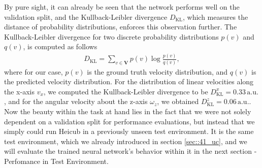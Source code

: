 By pure sight, it can already be seen that the network performs well on the validation split, and the Kullback-Leibler divergence $D_\text{KL}$, which measures the distance of probability distributions, enforces this observation further. The Kullback-Leibler divergence for two discrete probability distributions $p(v)$ and $q(v)$, is computed as follows
\begin{align}
	D_\text{KL} = \sum_{v\in \bm{V}}p(v)\log\frac{p(v)}{q(v)},
\end{align}
where for our case, $p(v)$ is the ground truth velocity distribution, and $q(v)$ is the predicted velocity distribution. For the distribution of linear velocities along the x-axis $v_x$, we computed the Kullback-Leibler divergence to be $D^x_\text{KL}=0.33\,\text{a.u.}$, and for the angular velocity about the z-axis $\omega_z$, we obtained $D^z_\text{KL}=0.06\,\text{a.u.}$. Now the beauty within the task at hand lies in the fact that we were not solely dependent on a validation split for performance evaluations, but instead that we simply could run Heicub in a previously unseen test environment. It is the same test environment, which we already introduced in section \ref{sec::41_uc}, and we will evaluate the trained neural network's behavior within it in the next section - Perfomance in Test Environment.
